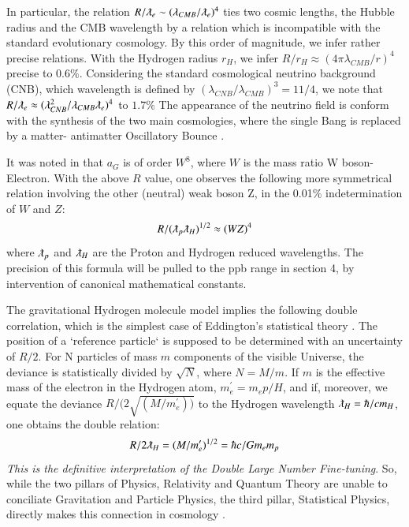 \documentclass[twoside,draft]{article}
\begin{document}
\begin{sloppypar}
{In particular, the relation $R/\lambdabar_{e} \sim (\lambda_{CMB} / \lambdabar_{e})^{4}$ ties two cosmic lengths, the Hubble radius and the CMB wavelength by a relation which is incompatible with the standard evolutionary cosmology. By this order of magnitude, we infer rather precise relations. With the Hydrogen radius $r_H$, we infer 
$
R/r_H \approx (4\pi \lambda_{CMB} /r)^{4}
$ 
precise to $0.6\%$. 
Considering the standard cosmological neutrino background (CNB), which wavelength is defined by $(\lambda_{CNB} / \lambda_{CMB})^{3} = 11/4$, we note that $R/ \lambdabar_{e} \approx
( \lambda_{CNB}^{2} / \lambda_{CMB} \lambdabar_{e} )^{4}$ to $1.7\%$
The appearance of the neutrino field is conform
with the synthesis of the two main cosmologies, where the single Bang is replaced by a matter-
antimatter Oscillatory Bounce \cite{Sanchez2}.

It was noted in \cite{Carr} that $a_{G}$ is of order $W^{8}$, where $W$ is the mass ratio W boson-
Electron. With the above $R$ value, one observes the following more symmetrical relation involving
the other (neutral) weak boson Z, in the 0.01\% indetermination of $W$ and $Z$:
\begin{equation}
R/(\lambdabar_{p}\lambdabar_{H})^{1/2}\approx (WZ)^4
\end{equation}
where $\lambdabar_{p}$ and $\lambdabar_{H}$ are the Proton and Hydrogen reduced wavelengths. The precision of this formula will be pulled to the ppb range in section 4, by intervention of canonical mathematical constants.

The gravitational Hydrogen molecule model \cite{Sanchez1} implies the following double correlation,
which is the simplest case of Eddington's statistical theory \cite{Eddy}. The position of a `reference particle`
is supposed to be determined with an uncertainty of ${R/2}$. For N particles of mass $m$ components of the visible Universe, the deviance is statistically divided by $\sqrt{N}$, where $N = M/m$. If $m$ is the effective mass of the electron in the Hydrogen atom, $m^{\prime}_{e} = m_{e} p/H$, and if, moreover, we equate
the deviance $R/(2\sqrt{(M/m^{\prime}_{e}))}$ to the Hydrogen wavelength $\lambdabar_{H} = \hbar/c m_{H}$, one obtains the double relation:
\begin{equation}
R/2\lambdabar_{H} = (M/m^{\prime}_{e})^{1/2} = \hbar c/G m_{e} m_{p}
\end{equation}
\textit{This is the definitive interpretation of the Double Large Number Fine-tuning}. So, while the two
pillars of Physics, Relativity and Quantum Theory are unable to conciliate Gravitation and Particle
Physics, the third pillar, Statistical Physics, directly makes this connection in cosmology \cite{Eddy}.

}
\end{sloppypar}
\end{document}
